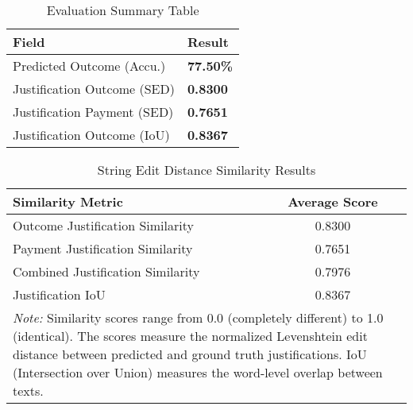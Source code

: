 
\begin{table}[H]
\centering
\caption{Evaluation Summary Table}
\label{tab:evaluation_summary}
\begin{tabular}{@{}lp{2cm}@{}}
\toprule
\textbf{Field} & \textbf{Result} \\
\midrule
Predicted Outcome (Accu.) & \textbf{77.50\%} \\
Justification Outcome (SED) &  \textbf{0.8300} \\
Justification Payment (SED) &  \textbf{0.7651} \\
Justification Outcome (IoU) &  \textbf{0.8367} \\
\bottomrule
\end{tabular}
\end{table}

\begin{table}[H]
\centering
\caption{String Edit Distance Similarity Results}
\label{tab:string_edit_distance_results}
\begin{tabular}{lc}
\toprule
\textbf{Similarity Metric} & \textbf{Average Score} \\
\midrule
Outcome Justification Similarity & 0.8300 \\
Payment Justification Similarity & 0.7651 \\
Combined Justification Similarity & 0.7976 \\
Justification IoU & 0.8367 \\
\midrule
\multicolumn{2}{p{13cm}}{\textit{Note:} Similarity scores range from 0.0 (completely different) to 1.0 (identical). 
The scores measure the normalized Levenshtein edit distance between predicted and ground truth justifications.
IoU (Intersection over Union) measures the word-level overlap between texts.} \\
\bottomrule
\end{tabular}
\end{table}

